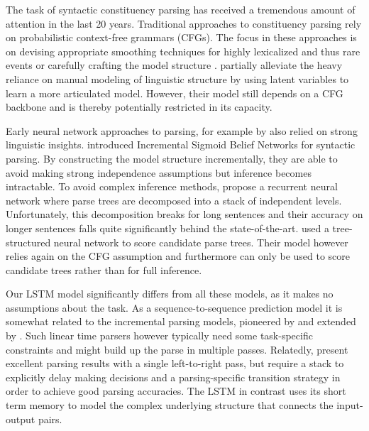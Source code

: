 \documentclass{article} \usepackage{nips15submit_e,times}
\newcommand\citet\cite
\newcommand\citep\cite
\begin{document}
The task of syntactic constituency parsing  
has received a tremendous amount of attention in the last 20 years.
Traditional approaches to constituency parsing rely on probabilistic
context-free grammars (CFGs).
The focus in these approaches is on devising appropriate smoothing
techniques for highly lexicalized and thus rare 
events \citep{collins:1997:ACL} or carefully crafting the
model structure \citep{klein-manning:2003:ACL}.
\cite{petrov-EtAl:2006:ACL} partially alleviate the heavy reliance on
manual modeling of linguistic structure by using latent variables to learn a
more articulated model.
However, their model still depends on a CFG backbone and is thereby potentially
restricted in its capacity. 

Early neural network approaches to parsing, for example by
\cite{henderson:2003:NAACL,henderson:2004:ACL} also relied on strong linguistic insights.
\cite{titov-henderson:2007:ACL} introduced Incremental Sigmoid Belief Networks for syntactic parsing.
By constructing the model structure incrementally, they are able to avoid 
making strong independence assumptions but inference becomes intractable.
To avoid complex inference methods, 
\cite{collobert2011deep} propose a recurrent neural network
where parse trees are decomposed into a stack of independent levels.
Unfortunately, this decomposition breaks for long sentences and
their accuracy on longer sentences falls quite significantly behind
the state-of-the-art.
\cite{socher2011parsing} used a tree-structured neural network to score candidate parse trees.
Their model however relies again on the CFG assumption and
furthermore can only be used to score candidate trees rather than for full inference.

Our LSTM model significantly differs from all these models, as it makes no assumptions about
the task. As a sequence-to-sequence prediction model it is somewhat
related to the incremental parsing models, pioneered by \cite{ratnaparkhi}
and extended by \cite{collins-roark:2004:ACL}.
Such linear time parsers however typically need some task-specific constraints
and might build up the parse in multiple passes. Relatedly, \citet{zhu-EtAl:2013:ACL}
present excellent parsing results with a single left-to-right pass, but require a stack
to explicitly delay making decisions and a parsing-specific transition strategy in order
to achieve good parsing accuracies.
The LSTM in contrast uses its short term memory to model the complex underlying structure
that connects the input-output pairs.
\end{document}
